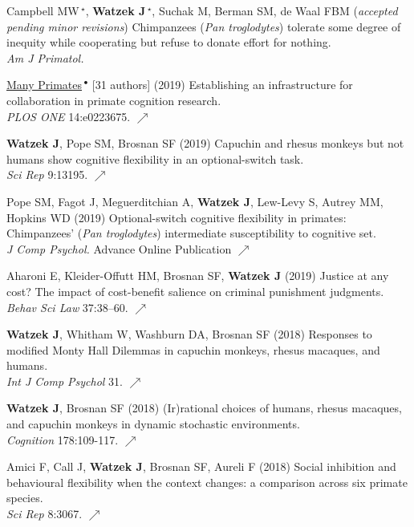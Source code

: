 \documentclass[]{friggeri-cv}
\begin{document}
\begin{enumerate}[label={[\,\arabic*\,]}]
  \item {Campbell MW\,{\Large${}^\star$}, \textbf{Watzek J\,{\Large${}^\star$}}, Suchak M, Berman SM, de Waal FBM (\emph{accepted pending minor revisions}) Chimpanzees (\emph{Pan troglodytes}) tolerate some degree of inequity while cooperating but refuse to donate effort for nothing. \\\emph{Am J Primatol.}}
  \item {\ul{Many Primates}\,${}^\bullet$ [31 authors] (2019) Establishing an infrastructure for collaboration in primate cognition research. \\\emph{PLOS ONE} 14:e0223675. \href{https://doi.org/10.1371/journal.pone.0223675}{\small $\nearrow$}}
  \item {\textbf{Watzek J}, Pope SM, Brosnan SF (2019) Capuchin and rhesus monkeys but not humans show cognitive flexibility in an optional-switch task. \\\emph{Sci Rep} 9:13195. \href{https://doi.org/10.1038/s41598-019-49658-0}{\small $\nearrow$}}
  \item {Pope SM, Fagot J, Meguerditchian A, \textbf{Watzek J}, Lew-Levy S, Autrey MM, Hopkins WD (2019) Optional-switch cognitive flexibility in primates: Chimpanzees' (\emph{Pan troglodytes}) intermediate susceptibility to cognitive set. \\\emph{J Comp Psychol.} Advance Online Publication \href{https://doi.org/10.1037/com0000194}{\small $\nearrow$} }
  \item {Aharoni E, Kleider-Offutt HM, Brosnan SF, \textbf{Watzek J} (2019) Justice at any cost? The impact of cost-benefit salience on criminal punishment judgments. \\\emph{Behav Sci Law} 37:38–60. \href{https://doi.org/10.1002/bsl.2388}{{\small $\nearrow$}}}
  \item {\textbf{Watzek J}, Whitham W, Washburn DA, Brosnan SF (2018) Responses to modified Monty Hall Dilemmas in capuchin monkeys, rhesus macaques, and humans. \\\emph{Int J Comp Psychol} 31. \href{https://escholarship.org/uc/item/1jn0t21r}{\small $\nearrow$}}
  \item {\textbf{Watzek J}, Brosnan SF (2018) (Ir)rational choices of humans, rhesus macaques, and capuchin monkeys in dynamic stochastic environments. \\\emph{Cognition} 178:109-117. \href{https://doi.org/10.1016/j.cognition.2018.05.019}{\small $\nearrow$}}
  \item {Amici F, Call J, \textbf{Watzek J}, Brosnan SF, Aureli F (2018) Social inhibition and behavioural flexibility when the context changes: a comparison across six primate species. \\\emph{Sci Rep} 8:3067. \href{https://doi.org/10.1038/s41598-018-21496-6}{\small $\nearrow$}}  \enlargethispage{1.5\baselineskip}

\end{enumerate}
\end{document}
